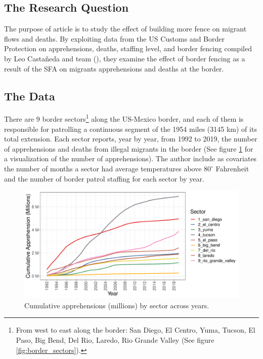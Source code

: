 \documentclass[titlepage]{article}
\theoremstyle{plain}
\theoremstyle{plain}
\begin{document}
\subsection*{The Research Question}

The purpose of \cite{Bansak2022} article is to study the effect of building more fence on migrant flows and deaths. By exploiting data from the US Customs and Border Protection on apprehensions, deaths, staffing level, and border fencing compiled by Leo Castañeda and team (\cite*{castaneda2017}), they examine the effect of border fencing as a result of the SFA on migrants apprehensions and deaths at the border.

\subsection*{The Data}

There are 9 border sectors\footnote{From west to east along the border: San Diego, El Centro, Yuma, Tucson, El Paso, Big Bend, Del Rio, Laredo, Rio Grande Valley (See figure \ref{fig:border_sectors}). } along the US-Mexico border, and each of them is responsible for patrolling a continuous segment of the 1954 miles (3145 km) of its total extension. Each sector reports, year by year, from 1992 to 2019, the number of apprehensions and deaths from illegal migrants in the border (See figure \ref{fig:plot_cum_app} for a visualization of the number of apprehensions). The author include as covariates the number of months a sector had average temperatures above $80^{\circ}$ Fahrenheit and the number of border patrol staffing for each sector by year.

\begin{figure}[H]
\centering
    \caption{Cumulative apprehensions (millions) by sector across years.} 
    \label{fig:plot_cum_app} 
    \includegraphics[width=\textwidth]{_images/plot_cum_app.pdf}
\end{figure}\textsc{}
\end{document}
